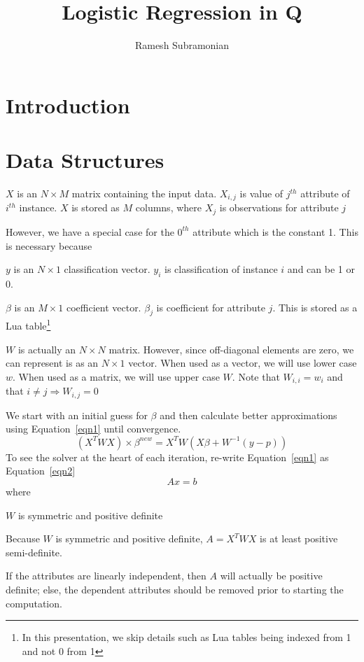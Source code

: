 \documentclass[12pt,timesnewroman,letterpaper]{article}
\begin{document}
\title{Logistic Regression in Q}
\author{ Ramesh Subramonian }
\maketitle
\thispagestyle{fancy}
\cfoot{}
\rfoot{{\small \thepage}}

\section{Introduction}

\TBC

\section{Data Structures}

\bi
\item \(X\) is an \(N \times M\) matrix containing the input data.
  \(X_{i, j}\) is value of \(j^{th}\) attribute of \(i^{th}\)
  instance. \(X\) is stored as \(M\) columns, where \(X_j\) is
  observations for attribute \(j\)

  However, we have a special case for the \(0^{th}\) attribute which is the
  constant 1. This is necessary because 

\item \(y\) is an \(N \times 1\) classification vector. \(y_i\) is
  classification of instance \(i\) and can be 1 or 0.
\item \(\beta\) is an \(M \times 1\) coefficient vector. \(\beta_j\)
  is coefficient for attribute \(j\). This is stored as a Lua table\footnote{In
    this presentation, we skip details such as Lua tables being indexed from 1
  and not 0 
from 1}
\item \(W\) is actually an \(N \times N\) matrix. However, since
  off-diagonal elements are zero, we can represent is as an \(N \times
  1\) vector.   When used as a vector, we will use lower case \(w\). When used
  as a matrix, we will use upper case \(W\). Note that \(W_{i, i} = w_i\) and
  that \( i \neq j \Rightarrow W_{i,j} = 0\)
  \ei

We start with an initial guess for \(\beta\) and then calculate better
approximations using Equation~\ref{eqn1} until convergence.
\begin{equation}
\label{eqn1}
(X^T W X) \times \beta ^{new} = X^T W ( X \beta + W^{-1}(y - p) )
\end{equation}
To see the solver at the heart of each iteration, re-write Equation~\ref{eqn1} as Equation~\ref{eqn2}
\begin{equation}
\label{eqn2}
A x = b
\end{equation}
where 
\be
\item \(W\) is symmetric and positive definite
\item Because \(W\) is symmetric and positive definite, \(A = 
  X^T W X\) is at least positive semi-definite.
\item If the attributes are linearly independent, then \(A\) will actually be
  positive definite; else, the dependent attributes should be removed prior to
  starting the computation.
\end{document}
